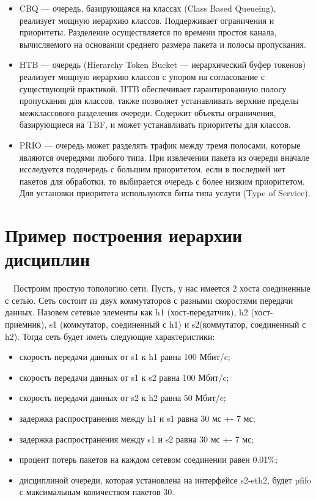 \documentclass[
  13pt,
  fontsize=13pt,
  russian,
  a4paper,
,captions=tableheading
]{scrreprt}
\providecommand{\tightlist}{%
  \setlength{\itemsep}{0pt}\setlength{\parskip}{0pt}}
\begin{document}
\begin{itemize}
\tightlist
\item
  CBQ --- очередь, базирующаяся на классах (Class Based Queueing),
  реализует мощную иерархию классов. Поддерживает ограничения и
  приоритеты. Разделение осуществляется по времени простоя канала,
  вычисляемого на основании среднего размера пакета и полосы
  пропускания.
\item
  HTB --- очередь (Hierarchy Token Bucket --- иерархический буфер
  токенов) реализует мощную иерархию классов с упором на согласование с
  существующей практикой. HTB обеспечивает гарантированную полосу
  пропускания для классов, также позволяет устанавливать верхние пределы
  межклассового разделения очереди. Содержит объекты ограничения,
  базирующиеся на TBF, и может устанавливать приоритеты для классов.
\item
  PRIO --- очередь может разделять трафик между тремя полосами, которые
  являются очередями любого типа. При извлечении пакета из очереди
  вначале исследуется подочередь с большим приоритетом, если в последней
  нет пакетов для обработки, то выбирается очередь с более низким
  приоритетом. Для установки приоритета используются биты типа услуги
  (Type of Service).
\end{itemize}

\hypertarget{ux43fux440ux438ux43cux435ux440-ux43fux43eux441ux442ux440ux43eux435ux43dux438ux44f-ux438ux435ux440ux430ux440ux445ux438ux438-ux434ux438ux441ux446ux438ux43fux43bux438ux43d}{%
\section{Пример построения иерархии
дисциплин}\label{ux43fux440ux438ux43cux435ux440-ux43fux43eux441ux442ux440ux43eux435ux43dux438ux44f-ux438ux435ux440ux430ux440ux445ux438ux438-ux434ux438ux441ux446ux438ux43fux43bux438ux43d}}

\(\quad\)Построим простую топологию сети. Пусть, у нас имеется 2 хоста
соединенные с сетью. Сеть состоит из двух коммутаторов с разными
скоростями передачи данных. Назовем сетевые элементы как h1
(хост-передатчик), h2 (хост-приемник), s1 (коммутатор, соединенный с h1)
и s2(коммутатор, соединенный с h2). Тогда сеть будет иметь следующие
характеристики:

\begin{itemize}
\tightlist
\item
  скорость передачи данных от s1 к h1 равна 100 Мбит/c;
\item
  скорость передачи данных от s1 к s2 равна 100 Мбит/c;
\item
  скорость передачи данных от s2 к h2 равна 50 Мбит/c;
\item
  задержка распространения между h1 и s1 равна 30 мс +- 7 мс;
\item
  задержка распространения между s1 и s2 равна 30 мс +- 7 мс;
\item
  процент потерь пакетов на каждом сетевом соединении равен 0.01\%;
\item
  дисциплиной очереди, которая установлена на интерфейсе s2-eth2, будет
  pfifo с максимальным количеством пакетов 30.
\end{itemize}
\end{document}
